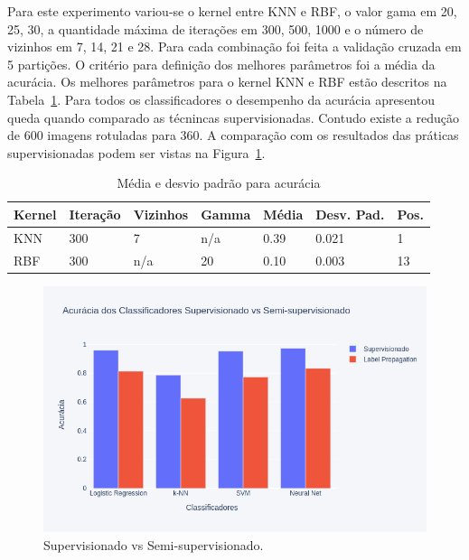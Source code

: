 \documentclass[a4paper, 12 pt, conference]{ieeeconf}  %
\begin{document}
Para este experimento variou-se o kernel entre KNN e RBF, o valor gama em 20, 25, 30, a quantidade máxima de iterações em 300, 500, 1000 e o número de vizinhos em 7, 14, 21 e 28. Para cada combinação foi feita a validação cruzada em 5 partições. O critério para definição dos melhores parâmetros foi a média da acurácia. Os melhores parâmetros para o kernel KNN e RBF estão descritos na Tabela~\ref{tab:meida_acuracia_lp_lbp}. Para todos os classificadores o desempenho da acurácia apresentou queda quando comparado as técnincas supervisionadas. Contudo existe a redução de 600 imagens rotuladas para 360. A comparação com os resultados das práticas supervisionadas podem ser vistas na Figura~\ref{fig:super_vs_semi_lbp}.


\begin{table}[!htbp]
    \caption{Média e desvio padrão para acurácia}
    \begin{center}
        \begin{tabular}{lllllll}
        	Kernel & Iteração & Vizinhos & Gamma &  Média & Desv. Pad. & Pos. \\
        	\hline
        	KNN    & 300             & 7                  & n/a  & 0.39       & 0.021               & 1       \\
        	\hline
        	RBF    & 300             & n/a                & 20   & 0.10       & 0.003               & 13      \\
        \end{tabular}
    \label{tab:meida_acuracia_lp_lbp}
    \end{center}
\end{table}

\begin{figure}[!htbp]
	\centering
	\includegraphics[width=1.0\linewidth,clip=true,trim=0cm 0cm 0cm 0cm, keepaspectratio=true]{bar_supervisionado_vs_semi_lbp.png}
	\caption{Supervisionado vs Semi-supervisionado.}
	\label{fig:super_vs_semi_lbp}
\end{figure}
\end{document}
